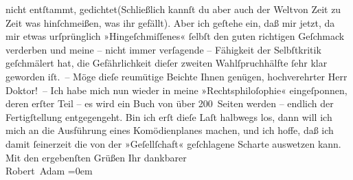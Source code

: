 \begin{ledgroupsized}[t]{13cm}
                     nicht entſtammt, gedichtet\newverse{}(Schließlich kannſt du aber auch
                     der Welt\newverse{}von Zeit zu Zeit was
                     hinſchmeißen, was ihr gefällt).\stanzaend{}\pstart
           Aber ich geſtehe ein, daß mir jetzt, da mir etwas urſprünglich »Hingeſchmiſſenes«
               ſelbſt den guten richtigen Geſchmack verderben und meine – nicht immer verſagende –
               Fähigkeit der Selbſtkritik geſchmälert hat, die Gefährlichkeit dieſer zweiten
               Wahlſpruchhälfte ſehr klar geworden iſt. –\pend
           \pstart
           Möge dieſe reumütige Beichte Ihnen genügen, hochverehrter Herr Doktor! –\pend
           \pstart
           Ich habe mich nun wieder in meine »Rechtsphiloſophie« eingeſponnen, deren erſter Teil – es wird ein Buch von
               über 200 Seiten werden – endlich der Fertigſtellung entgegengeht. Bin ich erſt dieſe
               Laſt halbwegs los, dann will ich mich an die Ausführung eines Komödienplanes machen,
               und ich hoffe, daß ich damit ſeinerzeit die von der »Geſellſchaft« geſchlagene Scharte auswetzen kann.\pend
           \pstart
           Mit den ergebenſten Grüßen Ihr\pend
           \pstart
           dankbarer{\\[\baselineskip]}\spacefill\mbox{Robert Adam}\pend
           \leftskip=0em{}
         
         \endnumbering{}\end{ledgroupsized}  \newcommand{\dateiname}{L02215}\newcommand{\titel}{Robert Adam an Arthur Schnitzler, 16. 7. 1915}\newcommand{\editorInnen}{Martin Anton Müller und Gerd-Hermann Susen}
      